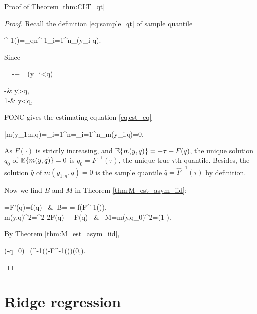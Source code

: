 \documentclass[10pt,a4paper]{book}
\begin{document}
\begin{pfbox}{Proof of Theorem \ref{thm:CLT_qt}}
	\begin{proof}
		Recall the definition \eqref{eq:sample_qt} of sample quantile
		\begin{sequation*}
			^{-1}(\tau)=\arg\min_{q\in{}}n^{-1}\sum_{i=1}^n\rho_\tau(y_i-q).
		\end{sequation*}
		Since 
		\begin{sequation*}
			= -\tau + \1_{(y_i<q)} = \begin{cases}
				-\tau &\text{ if } y>q,\\
				1-\tau &\text{ if } y<q,
			\end{cases}
		\end{sequation*} 
		FONC gives the estimating equation \eqref{eq:est_eq} 
		\begin{salign*}
			\bar{m}(y_{1:n},q)=\sum_{i=1}^{n}=\sum_{i=1}^{n}_{m(y_i,q)}=0.
		\end{salign*}
		As $F(\cdot)$ is strictly increasing, and $\mathbb E\{m(y,q)\}=-\tau+F(q)$,  the unique solution $q_0$ of $\mathbb E\{m(y,q)\}=0$ is $q_0=F^{-1}(\tau)$, the unique true $\tau$th quantile.
		Besides, the solution $\hat{q}$ of $\bar{m}(y_{1:n},q)=0$ is the sample quantile $\hat{q}=\hat{F}^{-1}(\tau)$ by definition.
		
		Now we find $B$ and $M$ in Theorem \ref{thm:M_est_asym_iid}:
		\begin{salign*}
			=F'(q)=f(q) \ &\Rightarrow \ B=-=-f(F^{-1}(\tau)), \\
			\bbE m(y,q)^2=\tau^2-2\tau F(q) + F(q) \ & \Rightarrow \ M=\bbE m(y,q_0)^2=\tau(1-\tau).
		\end{salign*}  
		By Theorem \ref{thm:M_est_asym_iid},
		\begin{sequation*}
			(-q_0)=(^{-1}(\tau)-F^{-1}(\tau))\dto \rmN\left(0,\right).
		\end{sequation*}
	\end{proof}
\end{pfbox}

\section{Ridge regression}\label{sec:ridge_reg}
\end{document}

